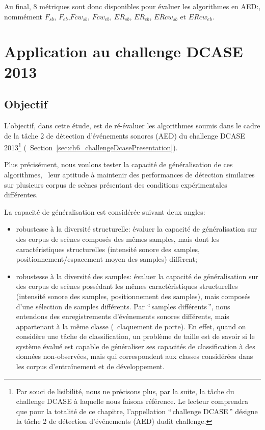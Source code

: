 Au final, 8 métriques sont donc disponibles pour évaluer les algorithmes en AED:, nommément $F_{sb}$, $F_{eb}$,$Fcw_{sb}$, $Fcw_{eb}$, $ER_{sb}$, $ER_{eb}$, $ERcw_{sb}$ et $ERcw_{eb}$.


\section{Application au challenge DCASE  2013}
\label{sec:ch5_appDcase2013}

\subsection{Objectif}

L'objectif, dans cette étude, est de ré-évaluer les algorithmes soumis dans le cadre de la tâche 2 de détection d'événements sonores (AED) du challenge DCASE 2013\footnote{Par souci de lisibilité, nous ne précisons plus, par la suite, la tâche du challenge DCASE à laquelle nous faisons référence. Le lecteur comprendra que pour la totalité de ce chapitre, l'appellation ``\,challenge DCASE\,'' désigne la tâche 2 de détection d'événements (AED) dudit challenge.} (\cf~Section~\ref{sec:ch6_challengeDcasePresentation}).

Plus précisément, nous voulons tester la capacité de généralisation de ces algorithmes, \ie~leur aptitude à maintenir des performances de détection similaires sur plusieurs corpus de scènes présentant des conditions expérimentales différentes.

La capacité de généralisation est considérée suivant deux angles:

\begin{itemize}
\item robustesse à la diversité structurelle: évaluer la capacité de généralisation sur des corpus de scènes composés des mêmes samples, mais dont les caractéristiques structurelles (intensité sonore des samples, positionnement/espacement moyen des samples) diffèrent;
\item robustesse à la diversité des samples: évaluer la capacité de généralisation sur des corpus de scènes possédant les mêmes caractéristiques structurelles (intensité sonore des samples, positionnement des samples), mais composés d'une sélection de samples différents. Par ``\,samples différents\,'', nous entendons des enregistrements d'événements sonores différents, mais appartenant à la même classe (\eg~claquement de porte). En effet, quand on considère une tâche de classification, un problème de taille est de savoir si le système évalué est capable de généraliser ses capacités de classification à des données non-observées, mais qui correspondent aux classes considérées dans les corpus d’entraînement et de développement.
\end{itemize}


